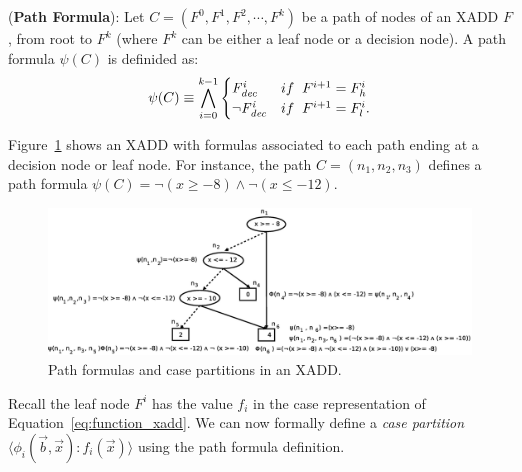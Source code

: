 \documentclass[twoside,11pt]{article}
\newenvironment{mydef}[1][Definition]{\begin{trivlist}
\item[\hskip \labelsep {\bfseries #1}]}{\end{trivlist}}
\begin{document}
\begin{mydef}(\textbf{Path Formula}):
Let $C=(F^0,F^1,F^2 , \cdots, F^{\mathit{k}})$ be a path of nodes of an XADD $F$, from root to $F^k$ (where $F^k$ can be either a leaf node or a decision node). A path formula $\psi(C)$ is definided as:
\begin{equation}
\psi(C) \equiv \bigwedge_{i=0}^{\mathit{k}-1}
\begin{cases}
 \mathit{F^i_{dec}} & if \hspace{2mm}  F^{i+1}= F^i_h\\ 
 \neg \mathit{F^i_{dec}} & if \hspace{2mm} F^{i+1}=F^i_l. \\ 
\end{cases} \label{eq:path}%
\end{equation}
\end{mydef}

Figure~\ref{fig:path} shows an XADD with formulas associated to each path ending at a decision node or leaf node. For instance, the path $C=(n_1, n_2, n_3)$ defines a path formula $\psi(C)=\neg (x \geq -8) \wedge \neg (x \leq -12)$.

\begin{figure}[t!]
\centering
\includegraphics[width=1\textwidth]{FiguresSource/path.eps}
\vspace{-2mm}
\caption{%
Path formulas and case partitions in an XADD.}
\label{fig:path}
\end{figure}
Recall the leaf node $F^i$ has the value $f_i$ in the case representation of Equation~\ref{eq:function_xadd}. We can now formally define a \emph{case partition} 
$\langle \phi_i(\vec{b},\vec{x}): f_i(\vec{x})\rangle$ using the path formula definition. 
\end{document}
